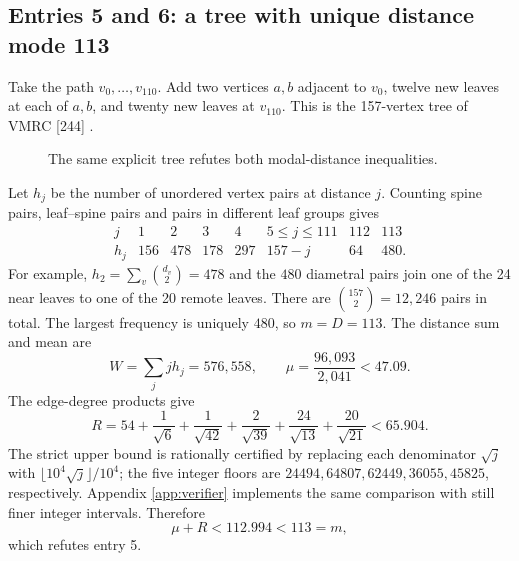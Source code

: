 \documentclass[11pt,a4paper]{article}
\theoremstyle{remark}\newtheorem{remark}[theorem]{Remark}
\begin{document}
\subsection{Entries 5 and 6: a tree with unique distance mode 113}\label{sec:modetree}
Take the path $v_0,\ldots,v_{110}$. Add two vertices $a,b$ adjacent to
$v_0$, twelve new leaves at each of $a,b$, and twenty new leaves at
$v_{110}$. This is the 157-vertex tree of VMRC [244] \cite{vmrc244}.
\begin{figure}[ht]\centering
{}
\caption{The same explicit tree refutes both modal-distance inequalities.}
\end{figure}

Let $h_j$ be the number of unordered vertex pairs at distance $j$.
Counting spine pairs, leaf--spine pairs and pairs in different leaf groups gives
\begin{equation}\label{eq:treehist}
\begin{array}{c|rrrrrrr}
j&1&2&3&4&5\le j\le111&112&113\\\hline
h_j&156&478&178&297&157-j&64&480.
\end{array}
\end{equation}
For example, $h_2=\sum_v\binom{d_v}{2}=478$ and the $480$ diametral
pairs join one of the 24 near leaves to one of the 20 remote leaves.
There are $\binom{157}{2}=12,246$ pairs in total. The largest frequency
is uniquely $480$, so $m=D=113$. The distance sum and mean are
\[
 W=\sum_j jh_j=576,558,\qquad
 \mu=\frac{96,093}{2,041}<47.09.
\]
The edge-degree products give
\begin{equation}\label{eq:treerandic}
 R=54+\frac1{\sqrt6}+\frac1{\sqrt{42}}+\frac2{\sqrt{39}}
                 +\frac{24}{\sqrt{13}}+\frac{20}{\sqrt{21}}<65.904.
\end{equation}
The strict upper bound is rationally certified by replacing each denominator
$\sqrt j$ with $\lfloor10^4\sqrt j\rfloor/10^4$; the five integer
floors are $24494,64807,62449,36055,45825$, respectively. Appendix
\ref{app:verifier} implements the same comparison with still finer integer
intervals. Therefore
\[
 \mu+R<112.994<113=m,
\]
which refutes entry 5.
\end{document}
